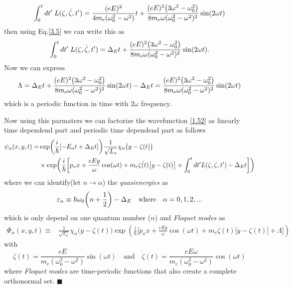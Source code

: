 \begin{equation} \label{3.10}
    \int_0^t dt' \; L(\zeta,\dot{\zeta},t')  =
    \frac{(eE)^2}{4m_e(\omega_0^2 - \omega^2)}t
    +
    \frac{(eE)^2\qty(3\omega^2 - \omega_0^2)}{8m_e\omega(\omega_0^2 - \omega^2)^2}
    \sin(2\omega t)
\end{equation}
then using Eq.\eqref{3.5} we can write this as
\begin{equation} \label{3.11}
    \int_0^t dt' \; L(\zeta,\dot{\zeta},t')  =
    \Delta_E t
    +
    \frac{(eE)^2\qty(3\omega^2 - \omega_0^2)}{8m_e\omega(\omega_0^2 - \omega^2)^2}
    \sin(2\omega t).
\end{equation}
Now we can express
\begin{equation} \label{3.12}
    \Lambda  =
    \Delta_E t
    +
    \frac{(eE)^2\qty(3\omega^2 - \omega_0^2)}{8m_e\omega(\omega_0^2 - \omega^2)^2}
    \sin(2\omega t) - \Delta_E t
    =
    \frac{(eE)^2\qty(3\omega^2 - \omega_0^2)}{8m_e\omega(\omega_0^2 - \omega^2)^2} \sin(2\omega t)
\end{equation}
which is a periodic function in time with $2\omega$ frequency.

\noindent
Now using this parmaters we can factorize the wavefunction \eqref{1.52} as linearly time dependend part and periodic time dependend part as follows
\begin{equation} \label{3.13}
  \begin{aligned}
    \psi_{\alpha}(x,y,t)  = &
    \exp(\frac{i}{\hbar}\qty[-E_nt + \Delta_E t ])
    \frac{1}{\sqrt{L_x}} \chi_n\big(y - \zeta(t)\big)
    \\
    & \times
    \exp(
     \frac{i}{\hbar}\bigg[
     p_x x +
     \frac{eEy}{\omega}\cos(\omega t)+
     m_e\dot{\zeta(t)}\big[y-\zeta(t)\big]
     + \int_0^{t}dt'L(\zeta,\dot{\zeta},t') - \Delta_E t  \bigg])
  \end{aligned}
\end{equation}
where we can identify(let $n \rightarrow \alpha$) the \textit{quasienergies} as
\begin{equation} \label{3.14}
  \varepsilon_{\alpha} \equiv
  \hbar \omega_0\qty(n + \frac{1}{2}) - \Delta_E \quad \text{where} \quad
  \alpha = 0,1,2, ...
\end{equation}
which is only depend on one quantum number ($n$) and \textit{Floquet modes} as
\begin{equation} \label{3.15}
  \begin{aligned}
    \Phi_{\alpha}(x,y,t) \equiv &
    \frac{1}{\sqrt{L_x}} \chi_{n}\big(y - \zeta(t)\big)
    \exp(
     \frac{i}{\hbar}\bigg[
     p_x x +
     \frac{eEy}{\omega}\cos(\omega t)+
     m_e\dot{\zeta}(t)\big[y-\zeta(t)\big]
     + \Lambda \bigg])
  \end{aligned}
\end{equation}
with
\begin{equation} \label{3.16}
  \zeta(t) = \frac{eE}{m_e(\omega_0^2 - \omega^2)}\sin(\omega t) \quad \text{and} \quad
  \dot{\zeta}(t) = \frac{eE\omega}{m_e(\omega_0^2 - \omega^2)}\cos(\omega t)
\end{equation}
where  \textit{Floquet modes} are time-periodic functions that also create a complete orthonormal set.
\hfill$\blacksquare$

